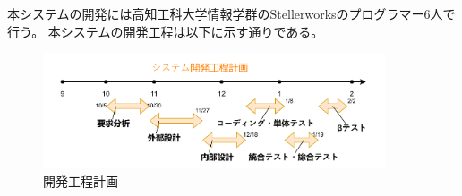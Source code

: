 本システムの開発には高知工科大学情報学群のStellerworksのプログラマー6人で行う。
本システムの開発工程は以下に示す通りである。
\begin{figure}[H]
  \centering
  \includegraphics[width=0.9\textwidth]{開発計画.pdf}
  \caption{開発工程計画}
  \label{gantt}
\end{figure}